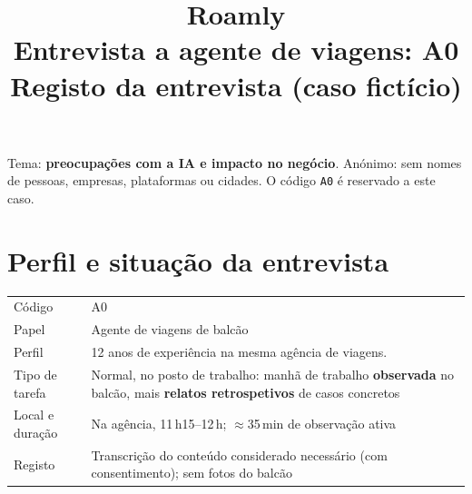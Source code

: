 \documentclass[11pt,a4paper]{article}
\title{\textbf{Roamly}\\[2pt]\large Entrevista a agente de viagens: A0\\\normalsize Registo da entrevista (caso fictício)}
\author{}\date{}
\begin{document}
\maketitle

\begin{aviso} 
Tema: \textbf{preocupações com a IA e impacto no negócio}. 
Anónimo: sem nomes de pessoas, empresas, plataformas ou 
cidades. O código \texttt{A0} é reservado a este caso.
\end{aviso}

\section{Perfil e situação da entrevista}
\begin{tabularx}{\textwidth}{@{}p{4.3cm}L@{}}
\toprule
Código & A0 \\
Papel & Agente de viagens de balcão \\
Perfil & 12 anos de experiência na mesma agência de viagens. \\
Tipo de tarefa & Normal, no posto de trabalho: manhã de trabalho \textbf{observada} no balcão, 
mais \textbf{relatos retrospetivos} de casos concretos \\
Local e duração & Na agência, 11\,h15--12\,h; \(\approx\)35\,min de observação ativa \\
Registo & Transcrição do conteúdo considerado necessário (com consentimento); sem fotos do balcão \\
\bottomrule
\end{tabularx}

\end{document}
